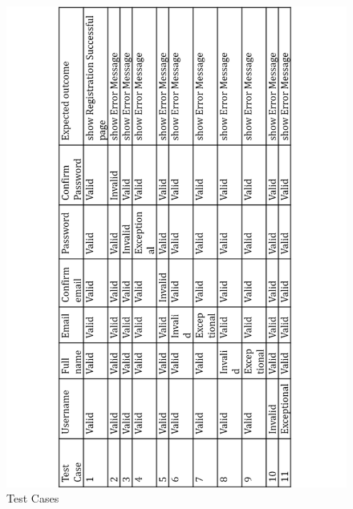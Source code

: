 \documentclass[english]{article}
\begin{document}
\begin{figure}[H]
\centering
\includegraphics[width=1.0\textwidth]{1.2}
\caption{Test Cases}
\end{figure}
\end{document}
